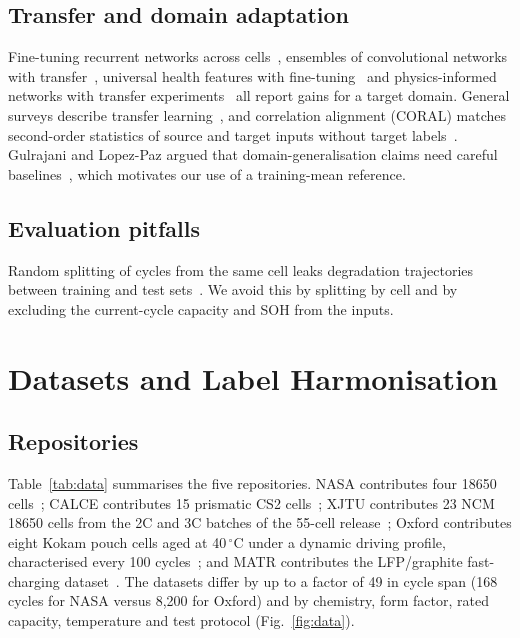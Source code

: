 \documentclass[journal]{IEEEtran}
\begin{document}
\subsection{Transfer and domain adaptation}
Fine-tuning recurrent networks across cells~\cite{tan2020transfer}, ensembles of convolutional networks with transfer~\cite{shen2020deep}, universal health features with fine-tuning~\cite{ren2023novel} and physics-informed networks with transfer experiments~\cite{wang2024pinn} all report gains for a target domain. General surveys describe transfer learning~\cite{pan2010survey}, and correlation alignment (CORAL) matches second-order statistics of source and target inputs without target labels~\cite{sun2016coral}. Gulrajani and Lopez-Paz argued that domain-generalisation claims need careful baselines~\cite{gulrajani2021lost}, which motivates our use of a training-mean reference.

\subsection{Evaluation pitfalls}
Random splitting of cycles from the same cell leaks degradation trajectories between training and test sets~\cite{kaufman2012leakage,kapoor2023leakage}. We avoid this by splitting by cell and by excluding the current-cycle capacity and SOH from the inputs.

\section{Datasets and Label Harmonisation}
\subsection{Repositories}
Table~\ref{tab:data} summarises the five repositories. NASA contributes four 18650 cells~\cite{saha2007nasa}; CALCE contributes 15 prismatic CS2 cells~\cite{he2011calce}; XJTU contributes 23 NCM 18650 cells from the 2C and 3C batches of the 55-cell release~\cite{wang2024pinn}; Oxford contributes eight Kokam pouch cells aged at 40\,$^\circ$C under a dynamic driving profile, characterised every 100 cycles~\cite{birkl2017oxford}; and MATR contributes the LFP/graphite fast-charging dataset~\cite{severson2019}. The datasets differ by up to a factor of 49 in cycle span (168 cycles for NASA versus 8,200 for Oxford) and by chemistry, form factor, rated capacity, temperature and test protocol (Fig.~\ref{fig:data}).
\end{document}
